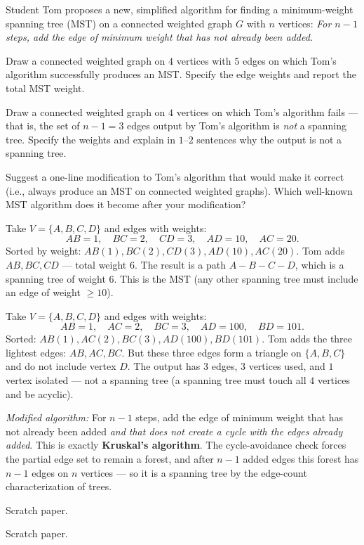 \documentclass[test,letterpaper]{cs20}
\begin{document}
\begin{problem}

Student Tom proposes a new, simplified algorithm for finding a minimum-weight spanning tree (MST) on a connected weighted graph $G$ with $n$ vertices: \emph{For $n - 1$ steps, add the edge of minimum weight that has not already been added.}

\subproblem Draw a connected weighted graph on $4$ vertices with $5$ edges on which Tom's algorithm successfully produces an MST. Specify the edge weights and report the total MST weight.

\subproblem Draw a connected weighted graph on $4$ vertices on which Tom's algorithm fails --- that is, the set of $n - 1 = 3$ edges output by Tom's algorithm is \emph{not} a spanning tree. Specify the weights and explain in $1$--$2$ sentences why the output is not a spanning tree.

\subproblem Suggest a one-line modification to Tom's algorithm that would make it correct (i.e., always produce an MST on connected weighted graphs). Which well-known MST algorithm does it become after your modification?

\begin{solution}
\subsolution Take $V = \{A,B,C,D\}$ and edges with weights:
\[
AB = 1,\quad BC = 2,\quad CD = 3,\quad AD = 10,\quad AC = 20.
\]
Sorted by weight: $AB(1), BC(2), CD(3), AD(10), AC(20)$. Tom adds $AB, BC, CD$ --- total weight $6$. The result is a path $A - B - C - D$, which is a spanning tree of weight $6$. This is the MST (any other spanning tree must include an edge of weight $\ge 10$).

\subsolution Take $V = \{A,B,C,D\}$ and edges with weights:
\[
AB = 1,\quad AC = 2,\quad BC = 3,\quad AD = 100,\quad BD = 101.
\]
Sorted: $AB(1), AC(2), BC(3), AD(100), BD(101)$. Tom adds the three lightest edges: $AB, AC, BC$. But these three edges form a triangle on $\{A,B,C\}$ and do not include vertex $D$. The output has $3$ edges, $3$ vertices used, and $1$ vertex isolated --- not a spanning tree (a spanning tree must touch all $4$ vertices and be acyclic).

\subsolution \emph{Modified algorithm:} For $n-1$ steps, add the edge of minimum weight that has not already been added \emph{and that does not create a cycle with the edges already added}. This is exactly \textbf{Kruskal's algorithm}. The cycle-avoidance check forces the partial edge set to remain a forest, and after $n - 1$ added edges this forest has $n - 1$ edges on $n$ vertices --- so it is a spanning tree by the edge-count characterization of trees.
\end{solution}

\pagebreak 

Scratch paper. 

\pagebreak

Scratch paper.

\end{problem}
\end{document}
